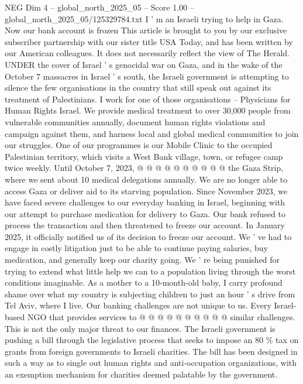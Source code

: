 \begin{textsample}{NEG Dim 4 – global\_north\_2025\_05 – Score 1.00 – global\_north\_2025\_05/125329784.txt}  \label{ex:f4_neg_249}
I ' m an Israeli trying to help in Gaza.
Now our bank account is frozen This article is brought to you by our exclusive subscriber partnership with our sister title USA Today, and has been written by our American colleagues.
It does not necessarily reflect the view of The Herald.
UNDER the cover of Israel ' s genocidal war on Gaza, and in the wake of the October 7 massacres in Israel ' s south, the Israeli government is attempting to silence the few organisations in the country that still speak out against its treatment of Palestinians.
I work for one of those organisations -- Physicians for Human Rights Israel.
We provide medical treatment to over 30,000 people from vulnerable communities annually, document human rights violations and campaign against them, and harness local and global medical communities to join our struggles.
One of our programmes is our Mobile Clinic to the occupied Palestinian territory, which visits a West Bank village, town, or refugee camp twice weekly.
Until October 7, 2023, @ @ @ @ @ @ @ @ @ @ the Gaza Strip, where we sent about 10 medical delegations annually.
We are no longer able to access Gaza or deliver aid to its starving population.
Since November 2023, we have faced severe challenges to our everyday banking in Israel, beginning with our attempt to purchase medication for delivery to Gaza.
Our bank refused to process the transaction and then threatened to freeze our account.
In January 2025, it officially notified us of its decision to freeze our account.
We ' ve had to engage in costly litigation just to be able to continue paying salaries, buy medication, and generally keep our charity going.
We ' re being punished for trying to extend what little help we can to a population living through the worst conditions imaginable.
As a mother to a 10-month-old baby, I carry profound shame over what my country is subjecting children to just an hour ' s drive from Tel Aviv, where I live.
Our banking challenges are not unique to us.
Every Israel-based NGO that provides services to @ @ @ @ @ @ @ @ @ @ similar challenges.
This is not the only major threat to our finances.
The Israeli government is pushing a bill through the legislative process that seeks to impose an 80 \% tax on grants from foreign governments to Israeli charities.
The bill has been designed in such a way as to single out human rights and anti-occupation organizations, with an exemption mechanism for charities deemed palatable by the government.

\end{textsample}
